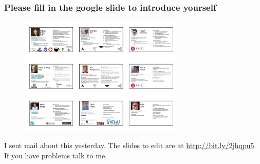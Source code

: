 \begin{frame}
\frametitle{Please fill in the google slide to introduce yourself}

\begin{figure}[htbp]
\begin{center}
\includegraphics[width=0.7\textwidth]{images/introducing-ourselves-examples.png}
\end{center}
\end{figure}

\begin{center}
\small{I sent mail about this yesterday. The slides to edit are at \url{http://bit.ly/2jhqpu5}. If you have problems talk to me.}
\end{center}

\end{frame}


